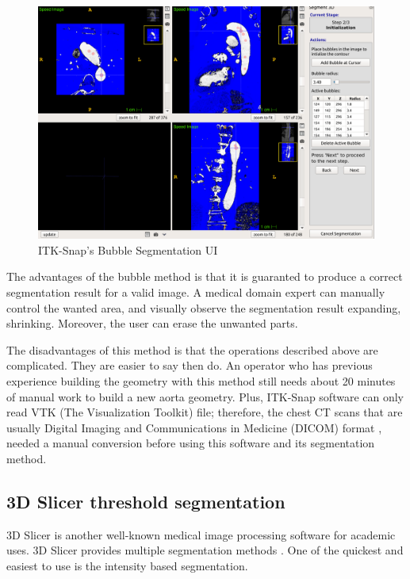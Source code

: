 \begin{figure}[ht]
    \centering
    \includegraphics[width=\textwidth]{figures/AGR/bubbles.png}
    \caption[ITK-Snap's Bubble Segmentation UI]{ITK-Snap's Bubble Segmentation UI \cite{py06nimg}}
    \label{fig_ITK}
\end{figure}

The advantages of the bubble method is that it is guaranted to produce a correct segmentation result for a valid image. A medical domain expert can manually control the wanted area, and visually observe the segmentation result expanding, shrinking. Moreover, the user can erase the unwanted parts.

The disadvantages of this method is that the operations described above are complicated. They are easier to say then do. An operator who has previous experience building the geometry with this method still needs about 20 minutes of manual work to build a new aorta geometry. Plus, ITK-Snap software can only read VTK (The Visualization Toolkit) file; therefore, the chest CT scans that are usually Digital Imaging and Communications in Medicine (DICOM) format \cite{10.1007/978-1-4020-8752-3_13}, needed a manual conversion before using this software and its segmentation method.

\subsection{3D Slicer threshold segmentation}
3D Slicer is another well-known medical image processing software for academic uses. 3D Slicer provides multiple segmentation methods \cite{Slicer_Wiki}. One of the quickest and easiest to use is the intensity based segmentation.

